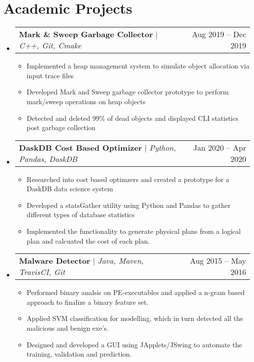 \documentclass[letterpaper,10pt]{article}
\makeatletter
\newcommand{\resumeItem}[1]{
  \item\small{
    {#1 \vspace{-2pt}}
  }
}
\newcommand{\resumeProjectHeading}[2]{
    \item
    \begin{tabular*}{0.97\textwidth}{l@{\extracolsep{\fill}}r}
      \small#1 & #2 \\
    \end{tabular*}\vspace{-7pt}
}
\newcommand{\resumeSubHeadingListStart}{\begin{itemize}[leftmargin=0.15in, label={}]}
\newcommand{\resumeSubHeadingListEnd}{\end{itemize}}
\newcommand{\resumeItemListStart}{\begin{itemize}}
\newcommand{\resumeItemListEnd}{\end{itemize}\vspace{-5pt}}
\makeatother
\begin{document}
\section{Academic Projects}
    \resumeSubHeadingListStart
    \resumeProjectHeading
          {\textbf{Mark \& Sweep Garbage Collector} $|$ \emph{C++, Git, Cmake}}{Aug 2019 -- Dec 2019}
          \resumeItemListStart
            \resumeItem{Implemented a heap management system to simulate object allocation via input trace files}
            \resumeItem{Developed Mark and Sweep garbage collector prototype to perform mark/sweep operations on heap objects}
            \resumeItem{Detected and deleted 99\% of dead objects and displayed CLI statistics post garbage collection}
          \resumeItemListEnd  
    \resumeProjectHeading
          {\textbf{DaskDB Cost Based Optimizer} $|$ \emph{Python, Pandas, DaskDB}}{Jan 2020 -- Apr 2020}
          \resumeItemListStart
            \resumeItem{Researched into cost based optimzers and created a prototype for a DaskDB data science system}
            \resumeItem{Developed a statsGather utility using Python and Pandas to gather different types of database statistics}
            \resumeItem{Implemented the functionality to generate physical plans from a logical plan and calcuated the cost of each plan.}
          \resumeItemListEnd
      \resumeProjectHeading
          {\textbf{Malware Detector} $|$ \emph{Java, Maven, TravisCI, Git}}{Aug 2015 -- May 2016}
          \resumeItemListStart
            \resumeItem{Performed binary analsis on PE-executables and applied a n-gram based approach to finalize a binary feature set.}
            \resumeItem{Applied SVM classification for modelling, which in turn detected all the malicious and benign exe's.}
            \resumeItem{Designed and developed a GUI using JApplets/JSwing to automate the training, validation and prediction.}
          \resumeItemListEnd
    \resumeSubHeadingListEnd

%
\end{document}

